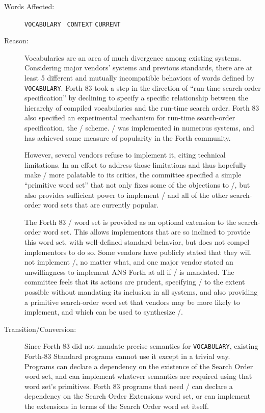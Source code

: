 \begin{description}
\item[Words Affected:]
	\texttt{VOCABULARY}	\texttt{ CONTEXT}	\texttt{CURRENT}

\item[Reason:]
	Vocabularies are an area of much divergence among existing systems.
	Considering major ven\-dors' systems and previous standards, there
	are at least 5 different and mutually incompatible behaviors of
	words defined by \texttt{VOCABULARY}. Forth 83 took a step in the
	direction of ``run-time search-order specification'' by declining
	to specify a specific relationship between the hierarchy of
	compiled vocabularies and the run-time search order. Forth 83 also
	specified an experimental mechanism for run-time search-order
	specification, the / scheme.
	/ was implemented in numerous
	systems, and has achieved some measure of popularity in the Forth
	community.

	However, several vendors refuse to implement it, citing technical
	limitations. In an effort to address those limitations and thus
	hopefully make / more
	palatable to its critics, the committee specified a simple
	``primitive word set'' that not only fixes some of the objections
	to /, but also provides
	sufficient power to implement /
	and all of the other search-order word sets that are currently
	popular.

	The Forth 83 / word set is
	provided as an optional extension to the search-order word set.
	This allows implementors that are so inclined to provide this
	word set, with well-defined standard behavior, but does not
	compel implementors to do so. Some vendors have publicly stated
	that they will not implement /,
	no matter what, and one major vendor stated an unwillingness to
	implement ANS Forth at all if /
	is mandated. The committee feels that its actions are prudent,
	specifying / to the extent
	possible without mandating its inclusion in all systems, and also
	providing a primitive search-order word set that vendors may be
	more likely to implement, and which can be used to synthesize
	/.

\item[Transition/Conversion:]
	Since Forth 83 did not mandate precise semantics for \texttt{VOCABULARY},
	existing Forth-83 Standard programs cannot use it except in a
	trivial way. Programs can declare a dependency on the existence
	of the Search Order word set, and can implement whatever semantics
	are required using that word set's primitives. Forth 83 programs
	that need / can declare a
	dependency on the Search Order Extensions word set, or can implement
	the extensions in terms of the Search Order word set itself.
\end{description}


